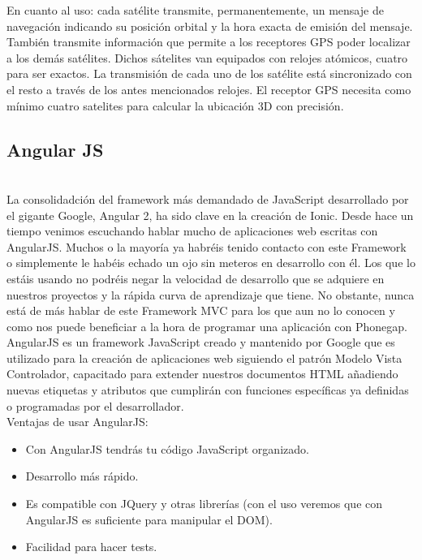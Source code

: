 \documentclass[a4paper, 11pt]{article}
\begin{document}
\begin{itemize}
          En cuanto al uso: cada satélite transmite, permanentemente, un mensaje
          de navegación indicando su posición orbital y la hora exacta de emisión
          del mensaje. También transmite información que permite a los receptores
          GPS poder localizar a los demás satélites. Dichos sátelites van
          equipados con relojes atómicos, cuatro para ser exactos. La transmisión
          de cada uno de los satélite está sincronizado con el resto a través de
          los antes mencionados relojes. El receptor GPS necesita como mínimo
          cuatro satelites para calcular la ubicación 3D con precisión.\\


        \subsection{Angular JS}\\

            La consolidadción del framework más demandado de JavaScript desarrollado
            por el gigante Google, Angular 2, ha sido clave en la creación de Ionic.
            Desde hace un tiempo venimos escuchando hablar mucho de aplicaciones web
            escritas con AngularJS. Muchos o la mayoría ya habréis tenido contacto
            con este Framework o simplemente le habéis echado un ojo sin meteros en
            desarrollo con él. Los que lo estáis usando no podréis negar la
            velocidad de desarrollo que se adquiere en nuestros proyectos y la
            rápida curva de aprendizaje que tiene. No obstante, nunca está de más
            hablar de este Framework MVC para los que aun no lo conocen y como nos
            puede beneficiar a la hora de programar una aplicación con Phonegap.\\

            AngularJS es un framework JavaScript creado y mantenido por Google que es
            utilizado para la creación de aplicaciones web siguiendo el patrón Modelo
            Vista Controlador, capacitado para extender nuestros documentos HTML
            añadiendo nuevas etiquetas y atributos que cumplirán con funciones
            específicas ya definidas o programadas por el desarrollador.\\

            Ventajas de usar AngularJS:
            \begin{itemize}
              \item {Con AngularJS tendrás tu código JavaScript organizado.}
              \item {Desarrollo más rápido.}
              \item {Es compatible con JQuery y otras librerías (con el uso veremos que
                     con AngularJS es suficiente para manipular el DOM).}
              \item {Facilidad para hacer tests.}
            \end{itemize}


\end{itemize}
\end{document}
